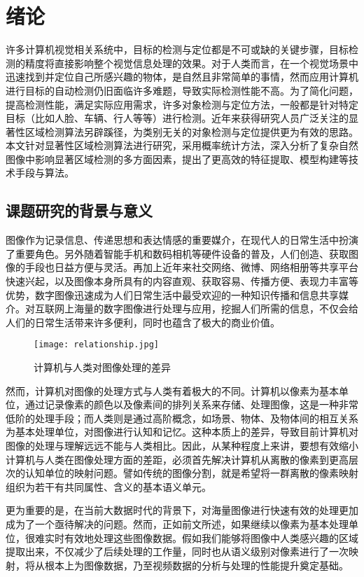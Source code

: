 
\chapter{绪论}
许多计算机视觉相关系统中，目标的检测与定位都是不可或缺的关键步骤，目标检测的精度将直接影响整个视觉信息处理的效果。对于人类而言，在一个视觉场景中迅速找到并定位自己所感兴趣的物体，是自然且非常简单的事情，然而应用计算机进行目标的自动检测仍旧面临许多难题，导致实际检测性能不高。为了简化问题，提高检测性能，满足实际应用需求，许多对象检测与定位方法，一般都是针对特定目标（比如人脸、车辆、行人等等）进行检测。近年来获得研究人员广泛关注的显著性区域检测算法另辟蹊径，为类别无关的对象检测与定位提供更为有效的思路。本文针对显著性区域检测算法进行研究，采用概率统计方法，深入分析了复杂自然图像中影响显著区域检测的多方面因素，提出了更高效的特征提取、模型构建等技术手段与算法。

\section{课题研究的背景与意义}
图像作为记录信息、传递思想和表达情感的重要媒介，在现代人的日常生活中扮演了重要角色。另外随着智能手机和数码相机等硬件设备的普及，人们创造、获取图像的手段也日益方便与灵活。再加上近年来社交网络、微博、网络相册等共享平台快速兴起，以及图像本身所具有的内容直观、获取容易、传播方便、表现力丰富等优势，数字图像迅速成为人们日常生活中最受欢迎的一种知识传播和信息共享媒介\cite{CMM12THU}。对互联网上海量的数字图像进行处理与应用，挖掘人们所需的信息，不仅会给人们的日常生活带来许多便利，同时也蕴含了极大的商业价值。

\begin{figure}[h]
\centering
\texttt{[image: relationship.jpg]}
\caption{计算机与人类对图像处理的差异}
\end{figure}

然而，计算机对图像的处理方式与人类有着极大的不同。计算机以像素为基本单位，通过记录像素的颜色以及像素间的排列关系来存储、处理图像，这是一种非常低阶的处理手段；而人类则是通过高阶概念，如场景、物体、及物体间的相互关系为基本处理单位，对图像进行认知和记忆。这种本质上的差异，导致目前计算机对图像的处理与理解远远不能与人类相比。因此，从某种程度上来讲，要想有效缩小计算机与人类在图像处理方面的差距，必须首先解决计算机从离散的像素到更高层次的认知单位的映射问题。譬如传统的图像分割，就是希望将一群离散的像素映射组织为若干有共同属性、含义的基本语义单元。

更为重要的是，在当前大数据时代的背景下，对海量图像进行快速有效的处理更加成为了一个亟待解决的问题。然而，正如前文所述，如果继续以像素为基本处理单位，很难实时有效地处理这些图像数据。假如我们能够将图像中人类感兴趣的区域提取出来，不仅减少了后续处理的工作量，同时也从语义级别对像素进行了一次映射，将从根本上为图像数据，乃至视频数据的分析与处理的性能提升奠定基础。

